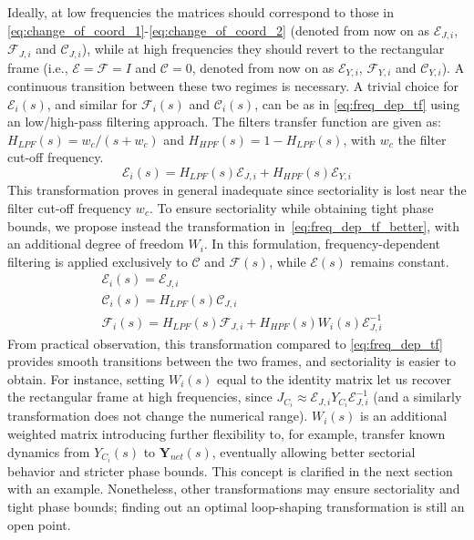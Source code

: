Ideally, at low frequencies the matrices should correspond to those in \eqref{eq:change_of_coord_1}-\eqref{eq:change_of_coord_2} (denoted from now on as $\mathcal{E}_{J,i}$, $\mathcal{F}_{J,i}$ and $\mathcal{C}_{J,i}$), while at high frequencies they should revert to the rectangular frame (i.e., $\mathcal{E}=\mathcal{F}=I$ and $\mathcal{C}=0$, denoted from now on as $\mathcal{E}_{Y,i}$, $\mathcal{F}_{Y,i}$ and $\mathcal{C}_{Y,i}$). A continuous transition between these two regimes is necessary. A trivial choice for $\mathcal{E}_i(s)$, and similar for $\mathcal{F}_i(s)$ and $\mathcal{C}_i(s)$, can be as in \eqref{eq:freq_dep_tf} using an low/high-pass filtering approach. 
The filters transfer function are given as: $H_{LPF}(s)=w_c/(s+w_c)$ and $H_{HPF}(s)=1-H_{LPF}(s)$, with $w_c$ the filter cut-off frequency. 
\begin{equation}
    \mathcal{E}_i(s) = H_{LPF}(s)\mathcal{E}_{J,i}+H_{HPF}(s)\mathcal{E}_{Y,i}
    \label{eq:freq_dep_tf}
\end{equation}
This transformation proves in general inadequate since sectoriality is lost near the filter cut-off frequency $w_c$. 
To ensure sectoriality while obtaining tight phase bounds, we propose instead the transformation in~\eqref{eq:freq_dep_tf_better}, with an additional degree of freedom $W_i$. In this formulation, frequency-dependent filtering is applied exclusively to $\mathcal{C}$ and $\mathcal{F}(s)$, while $\mathcal{E}(s)$ remains constant.
\begin{equation}
\begin{aligned}
    &\mathcal{E}_i(s) = \mathcal{E}_{J,i} \\
    &\mathcal{C}_i(s) = H_{LPF}(s)\mathcal{C}_{J,i}\\
    &\mathcal{F}_i(s) = H_{LPF}(s)\mathcal{F}_{J,i}+H_{HPF}(s)W_i(s)\mathcal{E}_{J,i}^{-1}
\end{aligned}
\label{eq:freq_dep_tf_better}
\end{equation}
From practical observation, this transformation compared to \eqref{eq:freq_dep_tf} provides smooth transitions between the two frames, and sectoriality is easier to obtain.
For instance, setting $W_i(s)$ equal to the identity matrix
let us recover the rectangular frame at high frequencies, since $J_{C_i}\approx\mathcal{E}_{J,i}Y_{C_i}\mathcal{E}_{J,i}^{-1}$ (and a similarly transformation does not change the numerical range). $W_i(s)$ is an additional weighted matrix  introducing further flexibility to, for example, transfer known dynamics from $Y_{C_i}(s)$ to $\mathbf{Y}_{net}(s)$, eventually allowing better sectorial behavior and stricter phase bounds. This concept is clarified in the next section with an example. Nonetheless, other transformations may ensure sectoriality and tight phase bounds; finding out an optimal loop-shaping transformation is still an open point.